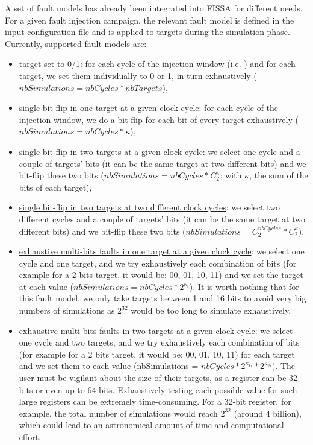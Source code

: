 A set of fault models has already been integrated into FISSA for different needs. For a given fault injection campaign, the relevant fault model is defined in the input configuration file and is applied to targets during the simulation phase.
Currently, supported fault models are:
\begin{itemize}
    \justifying
    \item \underline{target set to 0/1}: for each cycle of the injection window (i.e. ) and for each target, we set them individually to 0 or 1, in turn exhaustively ($nbSimulations = nbCycles * nbTargets$),
    \item \underline{single bit-flip in one target at a given clock cycle}: for each cycle of the injection window, we do a bit-flip for each bit of every target exhaustively ($nbSimulations = nbCycles * \kappa$),
    \item \underline{single bit-flip in two targets at a given clock cycle}: we select one cycle and a couple of targets' bits (it can be the same target at two different bits) and we bit-flip these two bits ($nbSimulations = nbCycles * C_{2}^\kappa$; with $\kappa$, the sum of the bits of each target),
    \item \underline{single bit-flip in two targets at two different clock cycles}:  we select two different cycles and a couple of targets' bits (it can be the same target at two different bits) and we bit-flip these two bits ($nbSimulations = C_{2}^{nbCycles} * C_{2}^\kappa$),
    \item \underline{exhaustive multi-bits faults in one target at a given clock cycle}: we select one cycle and one target, and we try exhaustively each combination of bits (for example for a 2 bits target, it would be: 00, 01, 10, 11) and we set the target at each value ($nbSimulations = nbCycles * 2^{\kappa_i}$). It is worth nothing that for this fault model, we only take targets between 1 and 16 bits to avoid very big numbers of simulations as $2^{32}$ would be too long to simulate exhaustively,
    \item \underline{exhaustive multi-bits faults in two targets at a given clock cycle}: we select one cycle and two targets, and we try exhaustively each combination of bits (for example for a 2 bits target, it would be: 00, 01, 10, 11) for each target and we set them to each value (nbSimulations = $nbCycles * 2^{\kappa_{1i}}* 2^{\kappa_{2i}}$). The user must be vigilant about the size of their targets, as a register can be 32 bits or even up to 64 bits. Exhaustively testing each possible value for such large registers can be extremely time-consuming. For a 32-bit register, for example, the total number of simulations would reach $2^{32}$ (around 4 billion), which could lead to an astronomical amount of time and computational effort.
\end{itemize}

